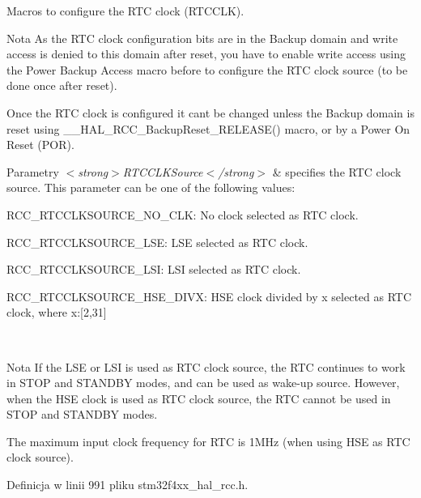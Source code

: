 Macros to configure the R\+TC clock (R\+T\+C\+C\+LK). 

\begin{DoxyNote}{Nota}
As the R\+TC clock configuration bits are in the Backup domain and write access is denied to this domain after reset, you have to enable write access using the Power Backup Access macro before to configure the R\+TC clock source (to be done once after reset). 

Once the R\+TC clock is configured it can\textquotesingle{}t be changed unless the Backup domain is reset using \+\_\+\+\_\+\+H\+A\+L\+\_\+\+R\+C\+C\+\_\+\+Backup\+Reset\+\_\+\+R\+E\+L\+E\+A\+S\+E() macro, or by a Power On Reset (P\+OR). 
\end{DoxyNote}

\begin{DoxyParams}{Parametry}
{\em $<$strong$>$\+R\+T\+C\+C\+L\+K\+Source$<$/strong$>$} & specifies the R\+TC clock source. This parameter can be one of the following values\+: \begin{DoxyItemize}
\item R\+C\+C\+\_\+\+R\+T\+C\+C\+L\+K\+S\+O\+U\+R\+C\+E\+\_\+\+N\+O\+\_\+\+C\+L\+K\+: No clock selected as R\+TC clock. \item R\+C\+C\+\_\+\+R\+T\+C\+C\+L\+K\+S\+O\+U\+R\+C\+E\+\_\+\+L\+S\+E\+: L\+SE selected as R\+TC clock. \item R\+C\+C\+\_\+\+R\+T\+C\+C\+L\+K\+S\+O\+U\+R\+C\+E\+\_\+\+L\+S\+I\+: L\+SI selected as R\+TC clock. \item R\+C\+C\+\_\+\+R\+T\+C\+C\+L\+K\+S\+O\+U\+R\+C\+E\+\_\+\+H\+S\+E\+\_\+\+D\+I\+V\+X\+: H\+SE clock divided by x selected as R\+TC clock, where x\+:\mbox{[}2,31\mbox{]} \end{DoxyItemize}
\\
\hline
\end{DoxyParams}
\begin{DoxyNote}{Nota}
If the L\+SE or L\+SI is used as R\+TC clock source, the R\+TC continues to work in S\+T\+OP and S\+T\+A\+N\+D\+BY modes, and can be used as wake-\/up source. However, when the H\+SE clock is used as R\+TC clock source, the R\+TC cannot be used in S\+T\+OP and S\+T\+A\+N\+D\+BY modes. 

The maximum input clock frequency for R\+TC is 1\+M\+Hz (when using H\+SE as R\+TC clock source). 
\end{DoxyNote}


Definicja w linii 991 pliku stm32f4xx\+\_\+hal\+\_\+rcc.\+h.

\mbox{\label{group___r_c_c___internal___r_t_c___clock___configuration_ga2b1e5349631886f29040d7a31c002718}} 
